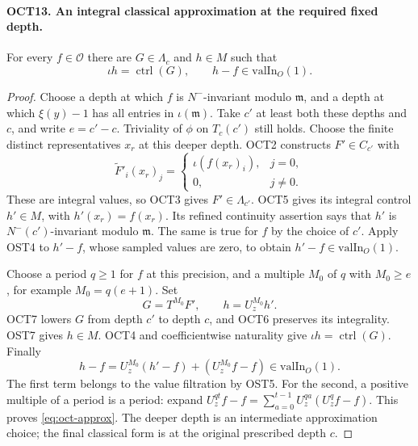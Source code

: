 \paragraph{OCT13. An integral classical approximation at the required fixed depth.}
\label{claim:OCT13}
For every $f\in\mathcal O$ there are
$G\in\Lambda_c$ and $h\in M$ such that
\begin{equation}\label{eq:oct-approx}
 \iota h=\operatorname{ctrl}(G),\qquad
                         h-f\in\mathrm{valIn}_O(1).
\end{equation}
\begin{proof}
Choose a depth at which $f$ is $N^-$-invariant modulo
$\mathfrak m$, and a depth at which $\xi(y)-1$ has all
entries in $\iota(\mathfrak m)$.  Take $c'$ at least both
these depths and $c$, and write $e=c'-c$.  Triviality of
$\phi$ on $T_c(c')$ still holds.  Choose the finite distinct
representatives $x_r$ at this deeper depth.  OCT2 constructs
$F'\in C_{c'}$ with
\[
      \widetilde F'_i(x_r)_j=
          \begin{cases}\iota(f(x_r)_i),&j=0,\\0,&j\ne0.
          \end{cases}
\]
These are integral values, so OCT3 gives $F'\in\Lambda_{c'}$.
OCT5 gives its integral control $h'\in M$, with
$h'(x_r)=f(x_r)$.  Its refined continuity assertion says
that $h'$ is $N^-(c')$-invariant modulo $\mathfrak m$.
The same is true for $f$ by the choice of $c'$.  Apply
OST4 to $h'-f$, whose sampled values are zero, to obtain
$h'-f\in\mathrm{valIn}_O(1)$.

Choose a period $q\geq1$ for $f$ at this precision, and a
multiple $M_0$ of $q$ with $M_0\geq e$, for example
$M_0=q(e+1)$.  Set
\[
                         G=T^{M_0}F',\qquad h=U_z^{M_0}h'.
\]
OCT7 lowers $G$ from depth $c'$ to depth $c$, and OCT6
preserves its integrality.  OST7 gives $h\in M$.
OCT4 and coefficientwise naturality give
$\iota h=\operatorname{ctrl}(G)$.  Finally
\[
 h-f=U_z^{M_0}(h'-f)+(U_z^{M_0}f-f)
                                             \in\mathrm{valIn}_O(1).
\]
The first term belongs to the value filtration by OST5.
For the second, a positive multiple of a period is a
period: expand
$U_z^{qt}f-f=\sum_{a=0}^{t-1}U_z^{qa}(U_z^qf-f)$.
This proves \eqref{eq:oct-approx}.  The deeper depth is an
intermediate approximation choice; the final classical form
is at the original prescribed depth $c$.
\end{proof}

